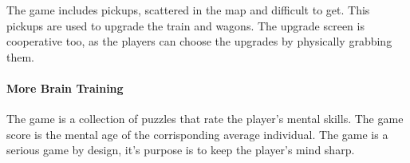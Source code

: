 \documentclass[12pt]{article}
\begin{document}
\vspace{0.4cm}
The game includes pickups, scattered in the map and difficult to get. This pickups are used to upgrade the train and wagons. The upgrade screen is cooperative too, as the players can choose the upgrades by physically grabbing them.

\vfill
{}

\clearpage

\paragraph{More Brain Training} \cite{mbt}
The game is a collection of puzzles that rate the player's mental skills. The game score is the mental age of the corrisponding average individual. The game is a serious game by design, it's purpose is to keep the player's mind sharp.

\vspace{0.4cm}
\vspace{0.4cm}
\end{document}
